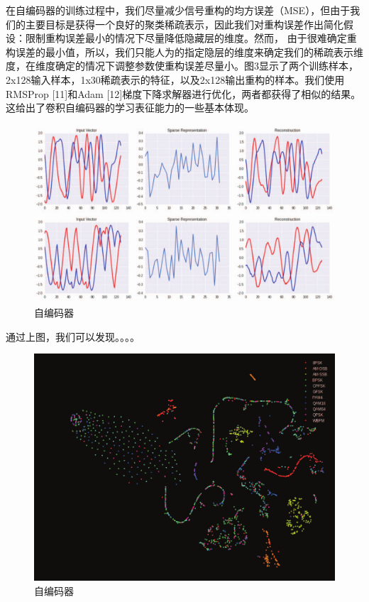 在自编码器的训练过程中，我们尽量减少信号重构的均方误差（MSE），但由于我们的主要目标是获得一个良好的聚类稀疏表示，因此我们对重构误差作出简化假设：限制重构误差最小的情况下尽量降低隐藏层的维度。然而， 由于很难确定重构误差的最小值，所以，我们只能人为的指定隐层的维度来确定我们的稀疏表示维度，在维度确定的情况下调整参数使重构误差尽量小。图3显示了两个训练样本，2x128输入样本，1x30稀疏表示的特征，以及2x128输出重构的样本。我们使用RMSProp [11]和Adam [12]梯度下降求解器进行优化，两者都获得了相似的结果。这给出了卷积自编码器的学习表征能力的一些基本体现。\par

\begin{figure}[!h]
	\centering
	\includegraphics[scale=0.2]{figures/chapter_3/examples_cae}
	\caption{自编码器}	\label{fig_3_2}
\end{figure}
通过上图，我们可以发现。。。。

\begin{figure}[!h]
	\centering
	\includegraphics[scale=0.2]{figures/chapter_3/cae_fea}
	\caption{自编码器}	\label{fig_3_2}
\end{figure}

